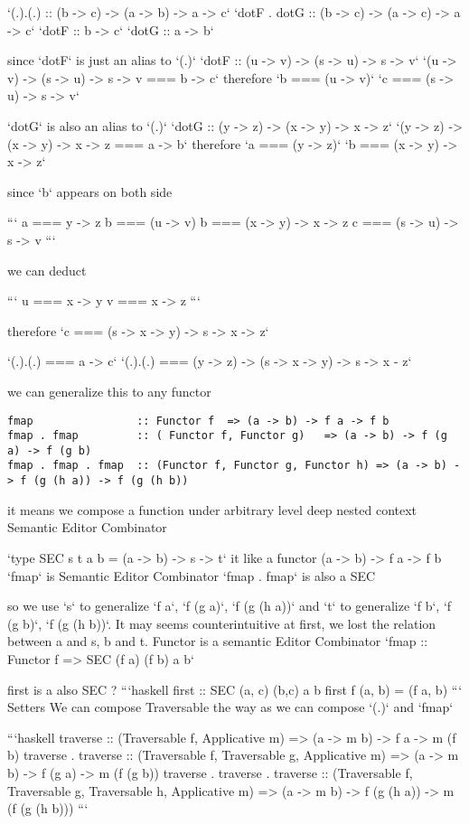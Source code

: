 `(.).(.) :: (b -> c) -> (a -> b) -> a -> c`
`dotF . dotG :: (b -> c) -> (a -> c) -> a -> c`
`dotF :: b -> c`
`dotG :: a -> b`

since `dotF` is just an alias to `(.)`
`dotF :: (u -> v) -> (s -> u) -> s -> v`
`(u -> v) -> (s -> u) -> s -> v === b -> c`
therefore
`b === (u -> v)`
`c === (s -> u) -> s -> v`

`dotG` is also an alias to `(.)`
`dotG :: (y -> z) -> (x -> y) -> x -> z`
`(y -> z) -> (x -> y) -> x -> z === a -> b`
therefore
`a === (y -> z)`
`b === (x -> y) -> x -> z`

since `b` appears on both side

```
a === y -> z
b === (u -> v)
b === (x -> y) -> x -> z
c === (s -> u) -> s -> v
```

we can deduct

```
u === x -> y
v === x -> z
```

therefore `c === (s -> x -> y) -> s -> x -> z`

`(.).(.) === a -> c`
`(.).(.) === (y -> z) -> (s -> x -> y) -> s -> x - z`



we can generalize this to any functor

\begin{verbatim}
fmap                :: Functor f  => (a -> b) -> f a -> f b
fmap . fmap         :: ( Functor f, Functor g)   => (a -> b) -> f (g a) -> f (g b)
fmap . fmap . fmap  :: (Functor f, Functor g, Functor h) => (a -> b) -> f (g (h a)) -> f (g (h b))
\end{verbatim}

it means we compose a function under arbitrary level deep nested context
Semantic Editor Combinator

`type SEC s t a b = (a -> b) -> s -> t`
it like a functor (a -> b) -> f a -> f b
`fmap` is Semantic Editor Combinator
`fmap . fmap` is also a SEC

so we use `s` to generalize `f a`,  `f (g a)`, `f (g (h a))` and `t` to generalize `f b`,  `f (g b)`, `f (g (h b))`.
It may seems counterintuitive at first, we lost the relation between a and s, b and t.
Functor is a semantic Editor Combinator
`fmap :: Functor f => SEC (f a) (f b) a b`

first is a also SEC ?
```haskell
first :: SEC (a, c) (b,c) a b
first f (a, b) = (f a, b)
```
Setters
We can compose Traversable the way as we can compose `(.)` and `fmap`

```haskell
traverse                       :: (Traversable f, Applicative m) => (a -> m b) -> f a -> m (f b)
traverse . traverse            :: (Traversable f, Traversable g, Applicative m) => (a -> m b) -> f (g a) -> m (f (g b))
traverse . traverse . traverse :: (Traversable f, Traversable g, Traversable h, Applicative m) => (a -> m b) -> f (g (h a)) -> m (f (g (h b)))
```

